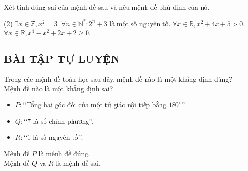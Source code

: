 \begin{vd}
	Xét tính đúng sai của mệnh đề sau và nêu mệnh đề phủ định của nó.
	\begin{tasks}(2)
		\task $\exists x\in \mathbb{Z},x^2=3$.
		\task $\forall n\in {\mathbb{N}}^{*}:2^n+3$ là một số nguyên tố.
		\task $\forall x\in \mathbb{R},x^2+4x+5>0$.
		\task $\forall x\in \mathbb{R},x^4-x^2+2x+2\ge 0$.
	\end{tasks}
\end{vd}

\subsection{BÀI TẬP TỰ LUYỆN}
\begin{bt}%
	Trong các mệnh đề toán học sau đây, mệnh đề nào là một khẳng định đúng? Mệnh đề nào là một khẳng định sai?
	\begin{itemize}
		\item [a)]$P\colon$\lq\lq Tổng hai góc đối của một tứ giác nội tiếp bằng $180^{\circ}$\rq\rq.
		\item [b)]$Q\colon$\lq\lq $7$ là số chính phương\rq\rq.
		\item [c)]$R\colon$\lq\lq $1$ là số nguyên tố\rq\rq.
	\end{itemize}
	\loigiai
	{
		Mệnh đề $P$ là mệnh đề đúng. \\
		Mệnh đề $Q$ và $R$ là mệnh đề sai. \\
	}
\end{bt}

